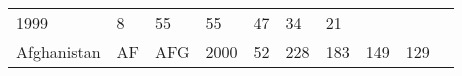 \documentclass[]{article}
\begin{document}
\begin{longtable}[]{@{}llllllllll@{}}
\begin{minipage}[t]{0.04\columnwidth}
1999\strut
\end{minipage} & \begin{minipage}[t]{0.08\columnwidth}\raggedright\strut
8\strut
\end{minipage} & \begin{minipage}[t]{0.09\columnwidth}\raggedright\strut
55\strut
\end{minipage} & \begin{minipage}[t]{0.09\columnwidth}\raggedright\strut
55\strut
\end{minipage} & \begin{minipage}[t]{0.09\columnwidth}\raggedright\strut
47\strut
\end{minipage} & \begin{minipage}[t]{0.09\columnwidth}\raggedright\strut
34\strut
\end{minipage} & \begin{minipage}[t]{0.09\columnwidth}\raggedright\strut
21\strut
\end{minipage}\tabularnewline
\begin{minipage}[t]{0.08\columnwidth}\raggedright\strut
Afghanistan\strut
\end{minipage} & \begin{minipage}[t]{0.04\columnwidth}\raggedright\strut
AF\strut
\end{minipage} & \begin{minipage}[t]{0.04\columnwidth}\raggedright\strut
AFG\strut
\end{minipage} & \begin{minipage}[t]{0.04\columnwidth}\raggedright\strut
2000\strut
\end{minipage} & \begin{minipage}[t]{0.08\columnwidth}\raggedright\strut
52\strut
\end{minipage} & \begin{minipage}[t]{0.09\columnwidth}\raggedright\strut
228\strut
\end{minipage} & \begin{minipage}[t]{0.09\columnwidth}\raggedright\strut
183\strut
\end{minipage} & \begin{minipage}[t]{0.09\columnwidth}\raggedright\strut
149\strut
\end{minipage} & \begin{minipage}[t]{0.09\columnwidth}\raggedright\strut
129\strut
\end{minipage} & \begin{minipage}[t]{0.09\columnwidth}\raggedright\strut

\end{minipage}
\end{longtable}
\end{document}
